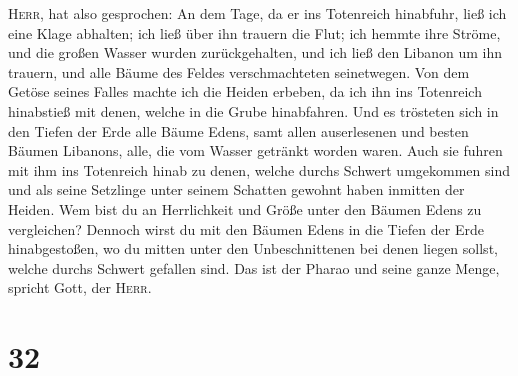 \textsc{Herr}, hat also gesprochen: An dem Tage, da er ins Totenreich
hinabfuhr, ließ ich eine Klage abhalten; ich ließ über ihn trauern die
Flut; ich hemmte ihre Ströme, und die großen Wasser wurden
zurückgehalten, und ich ließ den Libanon um ihn trauern, und alle Bäume
des Feldes verschmachteten seinetwegen.  Von dem Getöse
seines Falles machte ich die Heiden erbeben, da ich ihn ins Totenreich
hinabstieß mit denen, welche in die Grube hinabfahren. Und es trösteten
sich in den Tiefen der Erde alle Bäume Edens, samt allen auserlesenen
und besten Bäumen Libanons, alle, die vom Wasser getränkt worden waren.
 Auch sie fuhren mit ihm ins Totenreich hinab zu denen,
welche durchs Schwert umgekommen sind und als seine Setzlinge unter
seinem Schatten gewohnt haben inmitten der Heiden.  Wem
bist du an Herrlichkeit und Größe unter den Bäumen Edens zu vergleichen?
Dennoch wirst du mit den Bäumen Edens in die Tiefen der Erde
hinabgestoßen, wo du mitten unter den Unbeschnittenen bei denen liegen
sollst, welche durchs Schwert gefallen sind. Das ist der Pharao und
seine ganze Menge, spricht Gott, der \textsc{Herr}.

\hypertarget{section-31}{%
\section{32}\label{section-31}}

